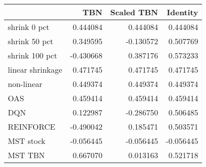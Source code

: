 \begin{tabular}{lrrr}
\toprule
{} &       TBN &  Scaled TBN &  Identity \\
\midrule
shrink 0 pct     &  0.444084 &    0.444084 &  0.444084 \\
shrink 50 pct    &  0.349595 &   -0.130572 &  0.507769 \\
shrink 100 pct   & -0.430668 &    0.387176 &  0.573233 \\
linear shrinkage &  0.471745 &    0.471745 &  0.471745 \\
non-linear       &  0.449374 &    0.449374 &  0.449374 \\
OAS              &  0.459414 &    0.459414 &  0.459414 \\
DQN              &  0.122987 &   -0.286750 &  0.506485 \\
REINFORCE        & -0.490042 &    0.185471 &  0.503571 \\
MST stock        & -0.056445 &   -0.056445 & -0.056445 \\
MST TBN          &  0.667070 &    0.013163 &  0.521718 \\
\bottomrule
\end{tabular}
